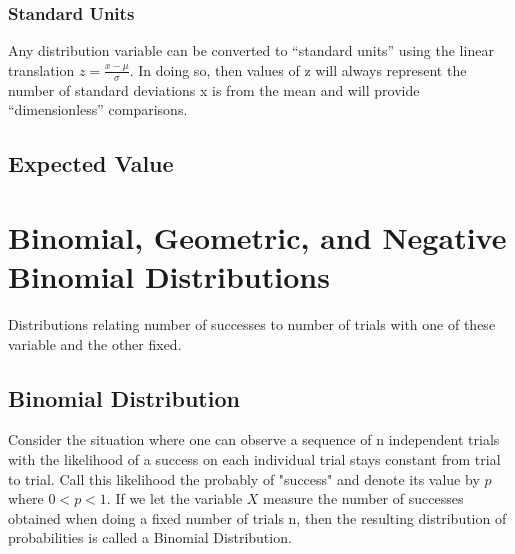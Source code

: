 \documentclass[10pt,]{book}
\theoremstyle{plain}
\theoremstyle{definition}
\theoremstyle{definition}
\numberwithin{equation}{section}
\newcommand{\lt}{ < }
\begin{document}
\subsection[Standard Units]{Standard Units}\label{subsection-16}
Any distribution variable can be converted to “standard units” using the linear translation 
			\(\displaystyle z = \frac{x-\mu}{\sigma}\). In doing so, then values of z will always represent the number of
			standard deviations x is from the mean and will provide “dimensionless” comparisons.%
\typeout{************************************************}
\typeout{************************************************}
\section[Expected Value]{Expected Value}\label{section-18}
\typeout{************************************************}
\typeout{************************************************}
\chapter[Binomial, Geometric, and Negative Binomial Distributions]{Binomial, Geometric, and Negative Binomial Distributions}\label{BinomNegBinom}
\typeout{************************************************}
\typeout{************************************************}
Distributions relating number of successes to number of trials with one 
	of these variable and the other fixed.%
\typeout{************************************************}
\typeout{************************************************}
\section[Binomial Distribution]{Binomial Distribution}\label{BinomialDistribution}
Consider the situation where one can observe a sequence  of n
	independent trials with the likelihood of a 
	success on each individual trial stays constant from trial to trial.
	Call this likelihood the probably of "success" and 
	denote its value by 
	\(p\) where \( 0 \lt p \lt 1 \).  
	If we let the variable \(X\) measure the number of successes 
	obtained when doing a fixed number of trials n, then the resulting
	distribution of probabilities is called a Binomial Distribution.%
\typeout{************************************************}
\typeout{************************************************}
\end{document}
